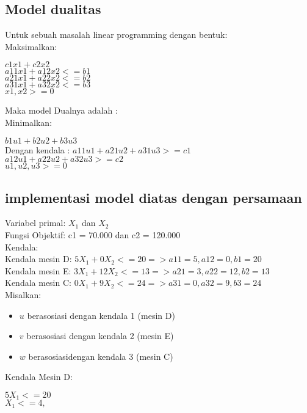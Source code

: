 \documentclass{article}
\begin{document}
\subsection*{Model dualitas}
Untuk sebuah masalah linear programming dengan bentuk: \\
 Maksimalkan: 
 \begin{center}
 $c1x1 + c2x2 $\\
 $a11x1 + a12x2 <= b1 $\\
 $a21x1 + a22x2 <= b2 $\\
 $a31x1 + a32x2 <= b3 $\\
 $ x1, x2 >=0$\\
\end{center}
Maka model Dualnya adalah : \\
Minimalkan: \\
 \begin{center}
$b1u1 + b2u2 +b3u3 $\\
Dengan kendala : $ a11u1 + a21u2 + a31u3 >=c1$\\
$a12u1 + a22u2 + a32u3 >= c2 $ \\
$u1,u2,u3 >=0$
\end{center}
\subsection*{implementasi model diatas dengan persamaan}
Variabel primal: $X_1$ dan $X_2$ \\
Fungsi Objektif: c1 = 70.000 dan c2 = 120.000\\
Kendala: \\
Kendala mesin D: $5X_1 + 0X_2 <= 20 => a11 =5, a12=0,b1=20$\\
Kendala mesin E: $3X_1 + 12X_2 <= 13 => a21 =3, a22=12,b2=13$\\
Kendala mesin C: $0X_1 + 9X_2 <= 24 => a31 =0, a32=9,b3=24$\\

Misalkan: \\
\begin{itemize}
  \item $u$ berasosiasi dengan kendala 1 (mesin D) 
     \item $v$ berasosiasi dengan kendala 2 (mesin E)
     \item $w$ berasosiasidengan kendala 3 (mesin C)
\end{itemize}

Kendala Mesin D: 
 \begin{center}
$5X_1 <= 20 $ \\
$X_1<=4,$ \\
 \end{center}
\end{document}
